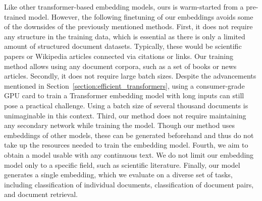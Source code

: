 Like other transformer-based embedding models, ours is warm-started from a
pre-trained model. However, the following finetuning of our embeddings avoids
some of the downsides of the previously mentioned methods. First, it does not
require any structure in the training data, which is essential as there is only
a limited amount of structured document datasets. Typically, these would be
scientific papers or Wikipedia articles connected via citations or links. Our
training method allows using any document corpora, such as a set of books or
news articles. Secondly, it does not require large batch sizes. Despite the
advancements mentioned in Section~\ref{section:efficient_transformers}, using a
consumer-grade GPU card to train a Transformer embedding model with long
inputs can still pose a practical challenge. Using a batch size of several
thousand documents is unimaginable in this context. Third, our method does not
require maintaining any secondary network while training the model. Though our
method uses embeddings of other models, these can be generated beforehand and
thus do not take up the resources needed to train the embedding model. Fourth,
we aim to obtain a model usable with any continuous text. We do not limit our
embedding model only to a specific field, such as scientific literature.
Finally, our model generates a single embedding, which we evaluate on a diverse
set of tasks, including classification of individual documents, classification of document pairs, and document retrieval.
